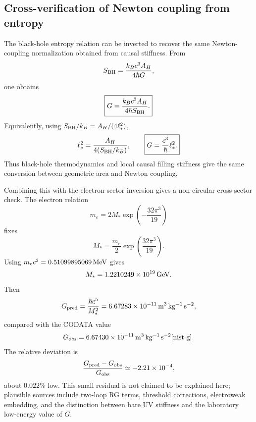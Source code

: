 \documentclass[11pt]{article}
\begin{document}
\subsection{Cross-verification of Newton coupling from entropy}

The black-hole entropy relation can be inverted to recover the same Newton-coupling normalization obtained from causal stiffness. From
\begin{equation}
S_{\rm BH}=\frac{k_Bc^3A_H}{4\hbar G},
\end{equation}
one obtains
\begin{equation}
\boxed{G=\frac{k_Bc^3A_H}{4\hbar S_{\rm BH}}.}
\end{equation}
Equivalently, using $S_{\rm BH}/k_B=A_H/(4\ell_*^2)$,
\begin{equation}
\ell_*^2=\frac{A_H}{4(S_{\rm BH}/k_B)},\qquad
\boxed{G=\frac{c^3}{\hbar}\ell_*^2.}
\end{equation}
Thus black-hole thermodynamics and local causal filling stiffness give the same conversion between geometric area and Newton coupling.

Combining this with the electron-sector inversion gives a non-circular cross-sector check. The electron relation
\begin{equation}
m_e=2M_*\exp\left(-\frac{32\pi^3}{19}\right)
\end{equation}
fixes
\begin{equation}
M_* = \frac{m_e}{2}\exp\left(\frac{32\pi^3}{19}\right).
\end{equation}
Using $m_ec^2=0.51099895069\,{\rm MeV}$ \cite{nist-electron-energy} gives
\begin{equation}
M_*=1.2210249\times10^{19}\,{\rm GeV}.
\end{equation}
Then
\begin{equation}
G_{\rm pred}=\frac{\hbar c^5}{M_*^2}=6.67283\times10^{-11}\,{\rm m^3\,kg^{-1}\,s^{-2}},
\end{equation}
compared with the CODATA value
\begin{equation}
G_{\rm obs}=6.67430\times10^{-11}\,{\rm m^3\,kg^{-1}\,s^{-2}}\cite{nist-g}.
\end{equation}
The relative deviation is
\begin{equation}
\frac{G_{\rm pred}-G_{\rm obs}}{G_{\rm obs}}\simeq -2.21\times10^{-4},
\end{equation}
about $0.022\%$ low. This small residual is not claimed to be explained here; plausible sources include two-loop RG terms, threshold corrections, electroweak embedding, and the distinction between bare UV stiffness and the laboratory low-energy value of $G$.
\end{document}
